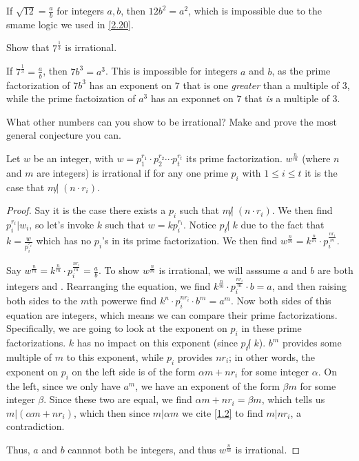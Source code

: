 \documentclass[../main.tex]{subfiles}
\begin{document}
If $\sqrt{12} = \frac{a}{b}$ for integers $a, b$, then $12b^2 = a^2$, which is impossible due to the smame logic we used in \ref{2.20}.



\begin{ex} \label{2.23}
  Show that $7^{\frac{1}{3}}$ is irrational.
\end{ex}

If $7^{\frac 1 3} = \frac{a}{b}$, then $7b^3 = a^3$. This is impossible for integers $a$ and $b$, as the prime factorization of $7b^3$ has an exponent on $7$ that is one \emph{greater} than a multiple of $3$, while the prime factoization of $a^3$ has an exponnet on $7$ that \emph{is} a multiple of $3$.



\begin{ques} \label{2.24}
  What other numbers can you show to be irrational? Make and prove the most general conjecture you can.
\end{ques}

\begin{PC} \label{PC 2.24}
  Let $w$ be an integer, with $w = p_1^{r_1} \cdot p_2^{r_2} \cdots p_t^{r_t}$ its prime factorization. $w^{\frac n m}$ (where $n$ and $m$ are integers) is irrational if for any one prime $p_i$ with $1 \leq i \leq t$ it is the case that $m \not | \; (n \cdot r_i)$.
\end{PC}

\begin{proof}
  Say it is the case there exists a $p_i$ such that $m \not | \; (n \cdot r_i)$. We then find $p_i^{r_i} | w_i$, so let's invoke $k$ such that $w = kp_i^{r_i}$. Notice $p_i \not | \; k$ due to the fact that $k = \frac{w}{p_i^{r_i}}$ which has no $p_i$'s in its prime factorization. We then find $w ^ {\frac n m} = k^{\frac n m} \cdot p_i ^ {\frac{nr_i}{m}}$.

  Say $w^{\frac n m} = k^{\frac n m} \cdot p_i^{\frac{nr_i}{m}} = \frac{a}{b}$. To show $w^{\frac n m}$ is irrational, we will asssume $a$ and $b$ are both integers and . Rearranging the equation, we find $k^{\frac n m} \cdot p_i^{\frac{nr_i}{m}} \cdot b = a$, and then raising both sides to the $m$th powerwe find $k^n \cdot p_i^{nr_i} \cdot b^m = a^m$.
  Now both sides of this equation are integers, which means we can compare their prime factorizations. Specifically, we are going to look at the exponent on $p_i$ in these prime factorizations. $k$ has no impact on this exponent (since $p_i \not | \; k$). $b^m$ provides some multiple of $m$ to this exponent, while $p_i$ provides $nr_i$; in other words, the exponent on $p_i$ on the left side is of the form $\alpha m + nr_i$ for some integer $\alpha$. On the left, since we only have $a^m$, we have an exponent of the form $\beta m$ for some integer $\beta$. Since these two are equal, we find $\alpha m + nr_i = \beta m$, which tells us $m | (\alpha m + nr_i)$, which then since $m | \alpha m$ we cite \ref{1.2} to find $m | nr_i$, a contradiction.

  Thus, $a$ and $b$ cannnot both be integers, and thus $w^{\frac n m}$ is irrational.
\end{proof}
\end{document}
